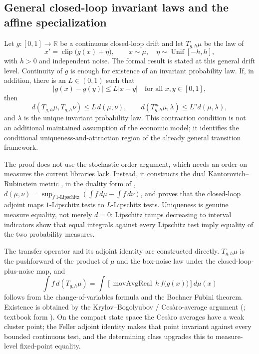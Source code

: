 \subsection{General closed-loop invariant laws and the affine specialization}

Let $g:[0,1]\to\mathbb R$ be a continuous closed-loop drift and let
$T_{g,h}\mu$ be the law of
\[
x'=\operatorname{clip}\bigl(g(x)+\eta\bigr),
\qquad x\sim\mu,\quad \eta\sim\operatorname{Unif}[-h,h],
\]
with $h>0$ and independent noise.  The formal result is stated at this
general drift level.  Continuity of $g$ is enough for existence of an
invariant probability law.  If, in addition, there is an $L\in(0,1)$
such that
\[
|g(x)-g(y)|\le L|x-y|
\quad\text{for all }x,y\in[0,1],
\]
then
\[
d(T_{g,h}\mu,T_{g,h}\nu)\le L\,d(\mu,\nu),
\qquad
d(T_{g,h}^{\,n}\mu,\lambda)\le L^n d(\mu,\lambda),
\]
and $\lambda$ is the unique invariant probability law.  This
contraction condition is not an additional maintained assumption of the
economic model; it identifies the conditional uniqueness-and-attraction
region of the already general transition framework.

The proof does not use the \citet{HopenhaynPrescott1992} stochastic-order
argument, which needs an order on measures the current libraries lack.
Instead, it constructs the dual Kantorovich--Rubinstein metric
\citep{KantorovichRubinstein1958}, in the duality form of
\citet[\S11.8]{Dudley2002},
$d(\mu,\nu)=\sup_{f\ 1\text{-Lipschitz}}
(\int f\,d\mu-\int f\,d\nu)$, and proves that the closed-loop adjoint maps
$1$-Lipschitz tests to $L$-Lipschitz tests.  Uniqueness is genuine
measure equality, not merely $d=0$: Lipschitz ramps decreasing to
interval indicators show that equal integrals against every Lipschitz
test imply equality of the two probability measures.

The transfer operator and its adjoint identity are constructed directly.
$T_{g,h}\mu$ is the pushforward of the product of $\mu$ and the box-noise
law under the closed-loop-plus-noise map, and
\[
\int f\,d(T_{g,h}\mu)
=\int\!\left[\operatorname{movAvgReal}\,h\,f\bigl(g(x)\bigr)\right]d\mu(x)
\]
follows from the change-of-variables formula and the Bochner Fubini
theorem.  Existence is obtained by the Krylov--Bogolyubov /
Ces\`aro-average argument
(\citealp{KrylovBogolyubov1937}; textbook form
\citealp[Thm.~12.10]{StokeyLucas1989}).  On the compact state space the
Ces\`aro averages have a weak cluster point; the Feller adjoint identity
makes that point invariant against every bounded continuous test, and
the determining class upgrades this to measure-level fixed-point
equality.

